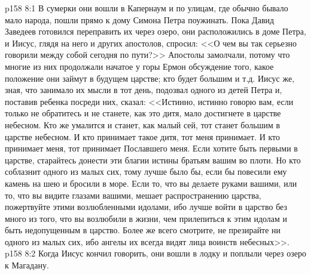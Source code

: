 \vs p158 8:1 В сумерки они вошли в Капернаум и по улицам, где обычно бывало мало народа, пошли прямо к дому Симона Петра поужинать. Пока Давид Заведеев готовился переправить их через озеро, они расположились в доме Петра, и Иисус, глядя на него и других апостолов, спросил: <<О чем вы так серьезно говорили между собой сегодня по пути?>> Апостолы замолчали, потому что многие из них продолжали начатое у горы Ермон обсуждение того, какое положение они займут в будущем царстве; кто будет большим и т.д. Иисус же, зная, что занимало их мысли в тот день, подозвал одного из детей Петра и, поставив ребенка посреди них, сказал: <<Истинно, истинно говорю вам, если только не обратитесь и не станете, как это дитя, мало достигнете в царстве небесном. Кто же умалится и станет, как малый сей, тот станет большим в царстве небесном. И кто принимает такое дитя, тот меня принимает. И кто принимает меня, тот принимает Пославшего меня. Если хотите быть первыми в царстве, старайтесь донести эти благии истины братьям вашим во плоти. Но кто соблазнит одного из малых сих, тому лучше было бы, если бы повесили ему камень на шею и бросили в море. Если то, что вы делаете руками вашими, или то, что вы видите глазами вашими, мешает распространению царства, пожертвуйте этими возлюбленными идолами, ибо лучше войти в царство без много из того, что вы возлюбили в жизни, чем прилепиться к этим идолам и быть недопущенным в царство. Более же всего смотрите, не презирайте ни одного из малых сих, ибо ангелы их всегда видят лица воинств небесных>>.
\vs p158 8:2 Когда Иисус кончил говорить, они вошли в лодку и поплыли через озеро к Магадану.
